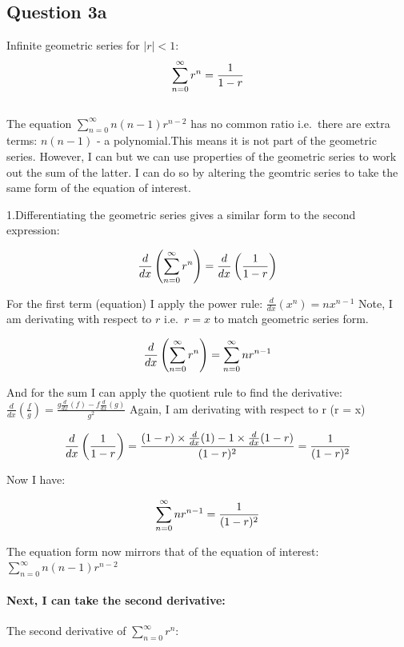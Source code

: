 \documentclass[
]{article}
\begin{document}
\subsection{Question 3a}\label{question-3a}

Infinite geometric series for \(|r| < 1\):\\
\[
\Large 
\sum_{n=0}^{\infty}r^n=\frac{1}{1-r} 
\]\\

The equation \(\sum_{n=0}^{\infty}n(n-1)r^{n-2}\) has no common ratio
i.e.~there are extra terms: \(n(n-1)\) - a polynomial.This means it is
not part of the geometric series. However, I can but we can use
properties of the geometric series to work out the sum of the latter. I
can do so by altering the geomtric series to take the same form of the
equation of interest.

1.Differentiating the geometric series gives a similar form to the
second expression:

\[
\Large
\frac{d}{dx} \left( \sum_{n=0}^{\infty} r^n \right) = \frac{d}{dx} \left( \frac{1}{1 - r} \right)
\]

For the first term (equation) I apply the power rule:
\(\frac{d}{dx} \left( x^n \right) = n x^{n-1}\) Note, I am derivating
with respect to \(r\) i.e.~\(r = x\) to match geometric series form.

\[
\Large
\frac{d}{dx} \left( \sum_{n=0}^{\infty} r^n \right) =
\sum_{n=0}^{\infty} nr^{n-1}
\]

And for the sum I can apply the quotient rule to find the derivative:
\(\frac{d}{dx} \left( \frac{f}{g} \right) = \frac{g \frac{d}{dx}(f) - f \frac{d}{dx}(g)}{g^2}\)
Again, I am derivating with respect to r (r = x)

\[
\Large
 \frac{d}{dx} \left( \frac{1}{1 - r} \right) = \frac{(1-r)\times\frac{d}{dx}(1)-1 \times \frac{d}{dx}(1-r)}{(1-r)^2}
 = \frac{1}{(1-r)^2}
\]

Now I have:

\[
\Large
\sum_{n=0}^{\infty} nr^{n-1} = \frac{1}{(1-r)^2}
\]

The equation form now mirrors that of the equation of interest:
\(\sum_{n=0}^{\infty}n(n-1)r^{n-2}\)

\paragraph{Next, I can take the second
derivative:}\label{next-i-can-take-the-second-derivative}

The second derivative of \(\sum_{n=0}^{\infty}r^n\):
\end{document}
